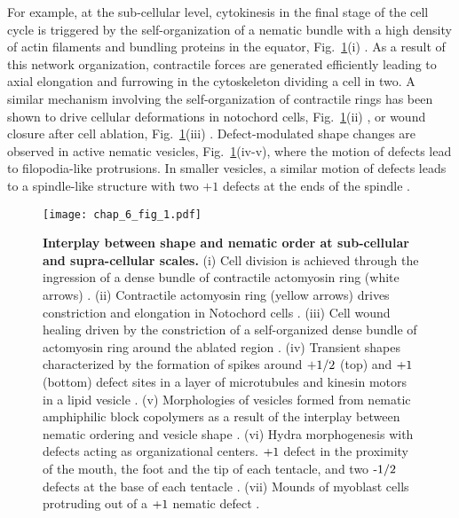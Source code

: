 For example, at the sub-cellular level, cytokinesis in the final stage of the cell cycle is triggered by the self-organization of a nematic bundle with a high density of actin filaments and bundling proteins in the equator, Fig.~\ref{fig_0}(i) \cite{anne2016, wollrab2016, leite2019}. As a result of this network organization, contractile forces are generated efficiently \cite{kelkar2020} leading to axial elongation  and furrowing in the cytoskeleton dividing a cell in two. A similar mechanism involving the self-organization of contractile rings has been shown to drive cellular deformations in notochord cells, Fig.~\ref{fig_0}(ii) \cite{Dong}, or wound closure after cell ablation, Fig.~\ref{fig_0}(iii) \cite{mandato2001}. %
Defect-modulated shape changes are observed in active nematic vesicles, Fig.~\ref{fig_0}(iv-v), where the motion of defects lead to filopodia-like protrusions. In smaller vesicles, a similar motion of defects leads to a spindle-like structure with two $+1$ defects at the ends of the spindle \cite{keber2014}. 


\begin{figure}[h!]
	\centering
	\texttt{[image: chap\_6\_fig\_1.pdf]}
	\caption{ \textbf{Interplay between shape and nematic order at sub-cellular and supra-cellular scales.} (i) Cell division is achieved through the ingression of a dense bundle of contractile actomyosin 
		ring (white arrows) \cite{anne2016}. (ii) Contractile actomyosin ring (yellow arrows) drives constriction and elongation in Notochord cells \cite{Dong}. (iii) Cell wound healing driven by the constriction of a self-organized dense bundle of actomyosin ring around the ablated region \cite{mandato2001}. (iv) Transient shapes characterized by the formation of spikes around $\textup{+}1/2$ (top) and $\textup{+}1$ (bottom) defect sites in a layer of microtubules and kinesin motors in a lipid vesicle \cite{keber2014}. (v)  Morphologies of vesicles formed from nematic amphiphilic block copolymers  as a result of the interplay between nematic ordering and vesicle shape \cite{xing2012}. (vi) Hydra morphogenesis with defects acting as organizational centers. $\textup{+}1$ defect in the proximity of the mouth, the foot and the tip of each tentacle, and two $\textup{-}1/2$ defects at the base of each tentacle \cite{maroudas2021}. (vii) Mounds of myoblast cells protruding out of a $\textup{+}1$ nematic defect \cite{guillamat2020}.}
	\label{fig_0}
\end{figure}



